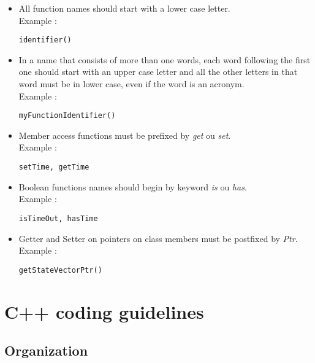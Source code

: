\documentclass[a4paper,twoside,openright,makeidx,12pt]{report}
\begin{document}
\begin{itemize}
\item All function names should start with a lower case letter.\\
  Example : \begin{verbatim}identifier()\end{verbatim}
\item In a name that consists of more than one words, each word following the first one should start with an upper case letter and all 		the other letters in that word must be in lower case, even if the word is an acronym.\\
  Example : \begin{verbatim}myFunctionIdentifier()\end{verbatim}
\item Member access functions must be prefixed by \textit{get} ou \textit{set}. \\
  Example : \begin{verbatim}setTime, getTime \end{verbatim}
\item Boolean functions names should begin by keyword \textit{is} ou \textit{has}.\\
  Example : \begin{verbatim}isTimeOut, hasTime\end{verbatim}
\item Getter and Setter on pointers on class members must be postfixed by \textit{Ptr}.\\
  Example : \begin{verbatim}getStateVectorPtr() \end{verbatim}
\end{itemize}


\chapter{C++ coding guidelines}

\section{Organization}
\end{document}
